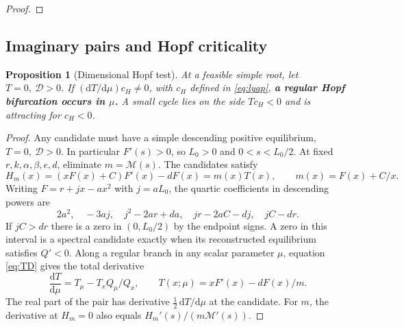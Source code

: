 \documentclass[12pt,a4paper,twoside,fleqn]{article}
\theoremstyle{journal}
\newtheorem{proposition}{Proposition}
\newcommand{\claim}[1]{{\normalfont\bfseries\boldmath #1}}
\newcommand{\dd}{\mathrm{d}}
\newcommand{\Det}{\mathcal D}
\begin{document}
\begin{proof}
\end{proof}

\subsection{Imaginary pairs and Hopf criticality}
\begin{proposition}[Dimensional Hopf test]\label{prop:hopf}
At a feasible simple root, let \(T=0,\ \Det>0\). If \((\dd T/\dd\mu)c_H\ne0\), with \(c_H\) defined in \eqref{eq:lyap}, \claim{a regular Hopf bifurcation occurs in \(\mu\).} A small cycle lies on the side \(Tc_H<0\) and is attracting for \(c_H<0\).
\end{proposition}
\begin{proof}
Any candidate must have a simple descending positive equilibrium, \(T=0,\ \Det>0\). In particular \(F'(s)>0\), so \(L_0>0\) and \(0<s<L_0/2\). At fixed \(r,k,\alpha,\beta,e,d\), eliminate \(m=\mathcal M(s)\). The candidates satisfy
\[
 H_m(x)=(xF(x)+C)F'(x)-dF(x)=m(x)T(x),
 \qquad m(x)=F(x)+C/x .
\]
Writing \(F=r+jx-ax^2\) with \(j=aL_0\), the quartic coefficients in descending powers are
\[
 2a^2,\quad -3aj,\quad j^2-2ar+da,\quad jr-2aC-dj,\quad jC-dr.
\]
If \(jC>dr\) there is a zero in \((0,L_0/2)\) by the endpoint signs. A zero in this interval is a spectral candidate exactly when its reconstructed equilibrium satisfies \(Q'<0\). Along a regular branch in any scalar parameter \(\mu\), equation \eqref{eq:TD} gives the total derivative
\begin{equation}\label{eq:Tprime}
 \frac{\dd T}{\dd\mu}=T_\mu-T_x Q_\mu/Q_x,\qquad
 T(x;\mu)=xF'(x)-dF(x)/m .
\end{equation}
The real part of the pair has derivative \(\frac12\,\dd T/\dd\mu\) at the candidate. For \(m\), the derivative at \(H_m=0\) also equals \(H_m'(s)/(m\mathcal M'(s))\).


\end{proof}
\end{document}
